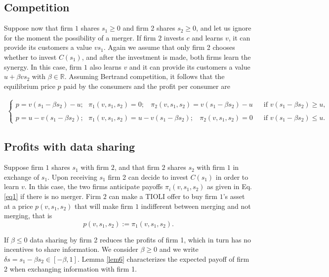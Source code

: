 \documentclass[a4paper,leqno]{article}%
\begin{document}
\subsection{Competition}

Suppose now that firm $1$ shares $s_1\geq 0$ and firm 2 shares $s_2\geq0$, and let us ignore for the moment the possibility of a merger. If firm $2$ invests $c$ and learns $v$, it can provide its customers a value $vs_1$. Again we assume that only firm 2 chooses whether to invest $C(s_1)$, and after the investment is made, both firms learn the synergy. In this case, firm $1$ also learns $v$ and it can provide its customers a value $u+\beta v s_2$ with $\beta \in \mathbb{R}$. Assuming Bertrand competition, it follows that the equilibrium price $p$ paid by the consumers and the profit per consumer are

\begin{align}\label{eq1}
\begin{cases}
    p=v (s_1-\beta s_2)-u ;~~~ \pi_1(v,s_1,s_2)=0 ;~~~~ \pi_2(v,s_1,s_2)=v(s_1-\beta s_2)-u &~~ \text{ if }v (s_1-\beta s_2)\geq u,\\
    \\
    p=u-v (s_1-\beta s_2) ;~~~ \pi_1(v,s_1,s_2)=u-v(s_1-\beta s_2);~~~~ \pi_2(v,s_1,s_2)=0 &~~ \text{ if }v (s_1-\beta s_2)\leq u.
\end{cases}
\end{align}


\subsection{Profits with data sharing}

Suppose firm $1$ shares $s_1$ with firm $2$, and that firm $2$ shares $s_2$ with firm $1$ in exchange of $s_1$. Upon receiving $s_1$ firm 2 can decide to invest $C(s_1)$ in order to learn $v$. In this case, the two firms anticipate payoffs $\pi_i(v, s_1,s_2)$ as given in Eq. \ref{eq1} if there is no merger. Firm $2$ can make a TIOLI offer to buy firm $1$'s asset at a price $p(v, s_1,s_2)$ that will make firm $1$ indifferent between merging and not merging, that is 
%
\begin{equation}
    p(v, s_1,s_2):=\pi_1(v, s_1,s_2).
\end{equation}


If $\beta\leq 0$ data sharing by firm 2 reduces the profits of firm 1, which in turn has no incentives to share information. We consider $\beta\geq 0$ and we write $\delta s=s_1-\beta s_2\in [-\beta,1]$. Lemma \ref{lem6} characterizes the expected payoff of firm 2 when exchanging information with firm 1.
\end{document}
